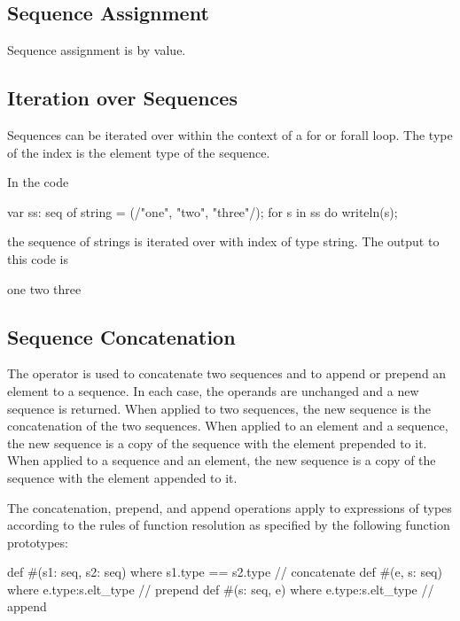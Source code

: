 \subsection{Sequence Assignment}
\label{Sequence_Assignment}

Sequence assignment is by value.

\subsection{Iteration over Sequences}
\label{Iteration_over_Sequences}

Sequences can be iterated over within the context of a for or forall
loop.  The type of the index is the element type of the sequence.
\begin{example}
In the code
\begin{chapel}
var ss: seq of string = (/"one", "two", "three"/);
for s in ss do
  writeln(s);
\end{chapel}
the sequence of strings  is iterated over with
index  of type string.  The output to this code is
\begin{chapel}
one
two
three
\end{chapel}
\end{example}

\subsection{Sequence Concatenation}
\label{Sequence_Concatenation}

The operator \chpl{#} is used to concatenate two sequences and to
append or prepend an element to a sequence.  In each case, the
operands are unchanged and a new sequence is returned.  When applied
to two sequences, the new sequence is the concatenation of the two
sequences.  When applied to an element and a sequence, the new
sequence is a copy of the sequence with the element prepended to it.
When applied to a sequence and an element, the new sequence is a copy
of the sequence with the element appended to it.

The concatenation, prepend, and append operations apply to expressions
of types according to the rules of function resolution as specified by
the following function prototypes:
\begin{chapel}
def #(s1: seq, s2: seq) where s1.type == s2.type // concatenate
def #(e, s: seq) where e.type:s.elt_type // prepend
def #(s: seq, e) where e.type:s.elt_type // append
\end{chapel}

